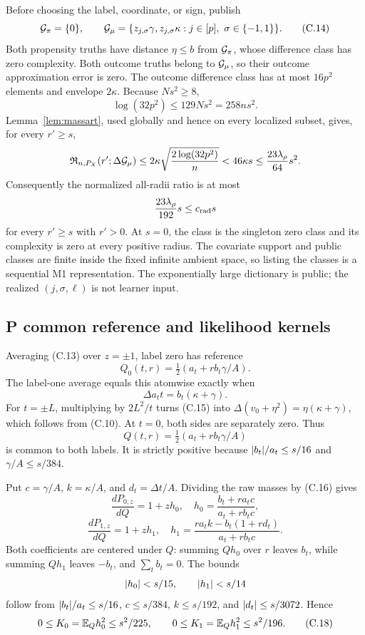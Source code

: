 Before choosing the label, coordinate, or sign, publish
\[
 \mathcal G_\pi=\{0\},\qquad
 \mathcal G_\mu=\{z_{j,\sigma}\gamma,z_{j,\sigma}\kappa:
                  j\in[p],\ \sigma\in\{-1,1\}\}.
 \tag{C.14}
\]
Both propensity truths have distance \(\eta\le b\) from \(\mathcal G_\pi\), whose
difference class has zero complexity.  Both outcome truths belong to
\(\mathcal G_\mu\), so their outcome approximation error is zero.  The outcome
difference class has at most \(16p^2\) elements and envelope \(2\kappa\).
Because \(Ns^2\ge8\),
\[
 \log(32p^2)\le129Ns^2=258ns^2.
\]
Lemma~\ref{lem:massart}, used globally and hence on every localized subset,
gives, for every \(r'\ge s\),
\[
 \mathfrak R_{n,P_X}(r';\Delta\mathcal G_\mu)
 \le2\kappa\sqrt{\frac{2\log(32p^2)}n}
 <46\kappa s\le\frac{23\lambda_\rho}{64}s^2.
\]
Consequently the normalized all-radii ratio is at most
\[
 \frac{23\lambda_\rho}{192}s\le c_{\rm rad}s
\]
for every \(r'\ge s\) with \(r'>0\).  At \(s=0\), the class is the
singleton zero class and its complexity is zero at every positive radius.
The covariate support and public classes are finite inside the fixed infinite
ambient space, so listing the classes is a sequential M1 representation.  The exponentially large dictionary is public; the realized
\((j,\sigma,\ell)\) is not learner input.

\subsection{P common reference and likelihood kernels}
\label{app:p-kernel}

Averaging (C.13) over \(z=\pm1\), label zero has reference
\[
 Q_0(t,r)=\tfrac12(a_t+rb_t\gamma/A).
\]
The label-one average equals this atomwise exactly when
\[
 \Delta a_tt=b_t(\kappa+\gamma).
 \tag{C.15}
\]
For \(t=\pm L\), multiplying by \(2L^2/t\) turns (C.15) into
\(\Delta(v_0+\eta^2)=\eta(\kappa+\gamma)\), which follows from (C.10).
At \(t=0\), both sides are separately zero.  Thus
\[
 Q(t,r)=\tfrac12(a_t+rb_t\gamma/A)
 \tag{C.16}
\]
is common to both labels.  It is strictly positive because
\(\lvert b_t\rvert/a_t\le s/16\) and \(\gamma/A\le s/384\).

Put \(c=\gamma/A\), \(k=\kappa/A\), and \(d_t=\Delta t/A\).
Dividing the raw masses by (C.16) gives
\[
 \frac{dP_{0,z}}{dQ}=1+zh_0,\quad
 h_0=\frac{b_t+ra_tc}{a_t+rb_tc},
\]
\[
 \frac{dP_{1,z}}{dQ}=1+zh_1,\quad
 h_1=\frac{ra_tk-b_t(1+rd_t)}{a_t+rb_tc}.
 \tag{C.17}
\]
Both coefficients are centered under \(Q\): summing \(Qh_0\) over \(r\)
leaves \(b_t\), while summing \(Qh_1\) leaves \(-b_t\), and
\(\sum_tb_t=0\).  The bounds
\[
 \lvert h_0\rvert<s/15,\qquad \lvert h_1\rvert<s/14
\]
follow from
\(\lvert b_t\rvert/a_t\le s/16\), \(c\le s/384\),
\(k\le s/192\), and \(\lvert d_t\rvert\le s/3072\).  Hence
\begin{equation}
 0\le K_0=\mathbb E_Qh_0^2\le s^2/225,\qquad
 0\le K_1=\mathbb E_Qh_1^2\le s^2/196.
 \tag{C.18}
\end{equation}

